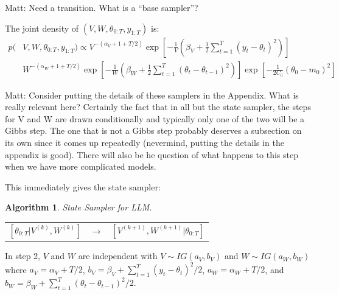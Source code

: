 \documentclass{article}
\newtheorem{alg}{Algorithm}
\newcommand{\matt}[1]{{\color{red} Matt: #1}}
\begin{document}
\matt{Need a transition. What is a ``base sampler''?}

The joint density of $(V,W,\theta_{0:T},y_{1:T})$ is:
\begin{align}
  p(&V,W,\theta_{0:T},y_{1:T}) \propto V^{-(\alpha_V + 1 + T/2)} \exp\left[-\frac{1}{V}\left(\beta_V + \frac{1}{2}\textstyle\sum_{t=1}^T(y_t - \theta_{t})^2\right)\right]\nonumber\\
  &W^{-(\alpha_W + 1 + T/2)}\exp\left[-\frac{1}{W}\left(\beta_W + \frac{1}{2}\textstyle\sum_{t=1}^T(\theta_t - \theta_{t-1})^2\right) \right] \exp\left[-\frac{1}{2C_0}(\theta_0 - m_0)^2\right]\label{llmstatejoint}
\end{align}

\matt{Consider putting the details of these samplers in the Appendix. What is really relevant here? Certainly the fact that in all but the state sampler, the steps for V and W are drawn conditionally and typically only one of the two will be a Gibbs step. The one that is not a Gibbs step probably deserves a subsection on its own since it comes up repeatedly (nevermind, putting the details in the appendix is good). There will also be he question of what happens to this step when we have more complicated models.}

This immediately gives the state sampler:
\begin{alg}State Sampler for LLM.\label{alg:LLMstate}\\
  \begin{center}
    \begin{tabular}{lll}
      $[\theta_{0:T}|V^{(k)},W^{(k)}]$& $\to$& $[V^{(k+1)},W^{(k+1)}|\theta_{0:T}]$
    \end{tabular}
  \end{center}
\end{alg}
In step 2, $V$ and $W$ are independent with $V\sim IG(a_V,b_V)$ and $W\sim IG(a_W, b_W)$ where $a_V = \alpha_V + T/2$, $b_V = \beta_V + \sum_{t=1}^T(y_t - \theta_t)^2/2$, $a_W = \alpha_W + T/2$, and $b_W = \beta_W + \sum_{t=1}^T(\theta_t - \theta_{t-1})^2/2$.
\end{document}
